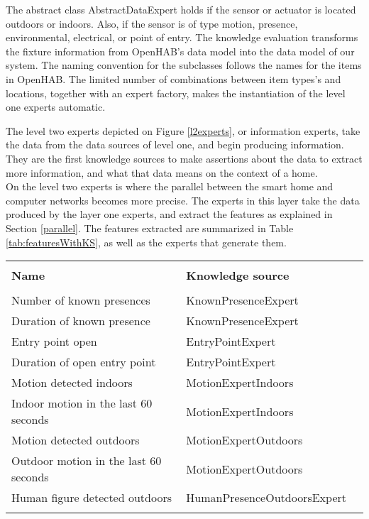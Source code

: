 The abstract class AbstractDataExpert holds if the sensor or actuator is located outdoors or indoors. Also, if the sensor is of type motion, presence, environmental, electrical, or point of entry. The knowledge evaluation transforms the fixture information from OpenHAB's data model into the data model of our system. The naming convention for the subclasses follows the names for the items in OpenHAB. The limited number of combinations between item types's and locations, together with an expert factory, makes the instantiation of the level one experts automatic.



The level two experts depicted on Figure \ref{l2experts}, or information experts, take the data from the data sources of level one, and begin producing information. They are the first knowledge sources to make assertions about the data to extract more information, and what that data means on the context of a home. \\
On the level two experts is where the parallel between the smart home and computer networks becomes more precise. The experts in this layer take the data produced by the layer one experts, and extract the features as explained in Section \ref{parallel}. The features extracted are summarized in Table \ref*{tab:featuresWithKS}, as well as the experts that generate them.

\bigskip
\bigskip
\bigskip
\bigskip
\bigskip
\bigskip

{\centering
	{\footnotesize
		 \label{tab:featuresWithKS} 
		\begin{tabular}{llr}
			\hline
			&  \\
			\textbf{Name}     & \textbf{Knowledge source} \\
			\hline
			&  \\
			Number of known presences & KnownPresenceExpert \\ 
			Duration of known presence & KnownPresenceExpert \\
			Entry point open & EntryPointExpert \\
			Duration of open entry point & EntryPointExpert \\
			Motion detected indoors  & MotionExpertIndoors \\
			Indoor motion in the last 60 seconds  & MotionExpertIndoors \\
			Motion detected outdoors  & MotionExpertOutdoors \\
			Outdoor motion in the last 60 seconds  & MotionExpertOutdoors \\
			Human figure detected outdoors  & HumanPresenceOutdoorsExpert \\
			\hline
			&  \\
		\end{tabular}
	}\par
}


